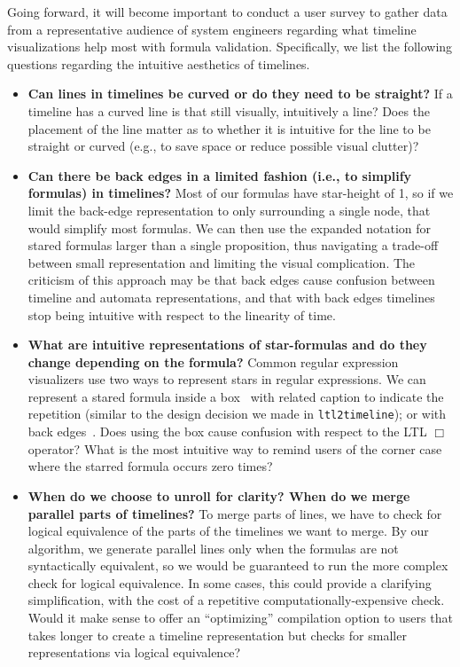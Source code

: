 \documentclass[conference]{IEEEtran}
\theoremstyle{definition}
\theoremstyle{remark}
\newcommand{\tool}{\texttt{ltl2timeline}}
\begin{document}
Going forward, it will become important to conduct a user survey to gather data from a representative audience of system engineers regarding what timeline visualizations help most with formula validation. Specifically, we list the following questions regarding the intuitive aesthetics of timelines.
\begin{itemize}
\item {\bf Can lines in timelines be curved or do they need to be straight?} If a timeline has a curved line is that still visually, intuitively a line? Does the placement of the line matter as to whether it is intuitive for the line to be straight or curved (e.g., to save space or reduce possible visual clutter)?

\item {\bf Can there be back edges in a limited fashion (i.e., to simplify formulas) in timelines?} Most of our formulas have star-height of 1, so if we limit the back-edge representation to only surrounding a single node, that would simplify most formulas. We can then use the expanded notation for stared formulas larger than a single proposition, thus navigating a trade-off between small representation and limiting the visual complication. The criticism of this approach may be that back edges cause confusion between timeline and automata representations, and that with back edges timelines stop being intuitive with respect to the linearity of time.

\item {\bf What are intuitive representations of star-formulas and do they change depending on the formula?} Common regular expression visualizers use two ways to represent stars in regular expressions. We can represent a stared formula inside a box~\cite{B22} with related caption to indicate the repetition (similar to the design decision we made in \tool); or with back edges~\cite{A20}. Does using the box cause confusion with respect to the LTL $\Box$ operator? What is the most intuitive way to remind users of the corner case where the starred formula occurs zero times?

\item {\bf When do we choose to unroll for clarity? When do we merge parallel parts of timelines?} To merge parts of lines, we have to check for logical equivalence of the parts of the timelines we want to merge. By our algorithm, we generate parallel lines only when the formulas are not syntactically equivalent, so we would be guaranteed to run the more complex check for logical equivalence. In some cases, this could provide a clarifying simplification, with the cost of a repetitive computationally-expensive check. Would it make sense to offer an ``optimizing'' compilation option to users that takes longer to create a timeline representation but checks for smaller representations via logical equivalence?
\end{itemize}
\end{document}
